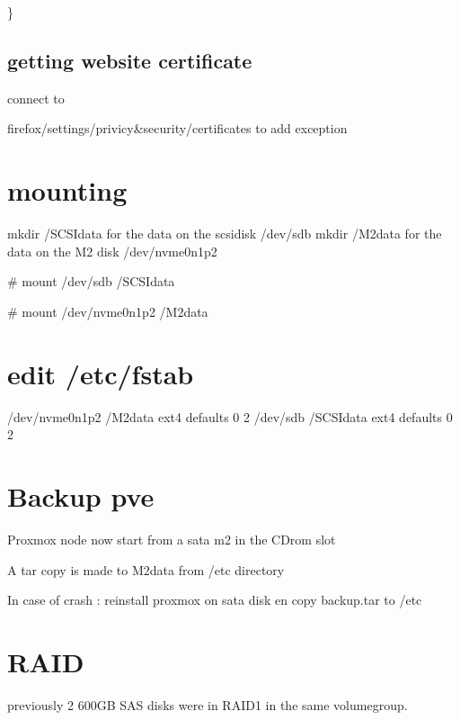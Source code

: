 \documentclass[letterpaper,10pt,english]{sphinxmanual}
\begin{document}
\sphinxAtStartPar
\}


\section{getting website certificate}
\label{\detokenize{elastic:getting-website-certificate}}
\sphinxAtStartPar
connect to 

\sphinxAtStartPar
firefox/settings/privicy\&security/certificates to add exception

\sphinxstepscope


\chapter{mounting}
\label{\detokenize{mounting:mounting}}\label{\detokenize{mounting::doc}}
\sphinxAtStartPar
mkdir /SCSIdata for the data on the scsidisk /dev/sdb
mkdir /M2data for the data on the M2 disk /dev/nvme0n1p2

\sphinxAtStartPar
\# mount /dev/sdb /SCSIdata

\sphinxAtStartPar
\# mount /dev/nvme0n1p2 /M2data


\chapter{edit  /etc/fstab}
\label{\detokenize{mounting:edit-etc-fstab}}
\sphinxAtStartPar
/dev/nvme0n1p2  /M2data  ext4  defaults  0  2
/dev/sdb  /SCSIdata  ext4  defaults  0  2

\sphinxstepscope


\chapter{Backup pve}
\label{\detokenize{backuppve:backup-pve}}\label{\detokenize{backuppve::doc}}
\sphinxAtStartPar
Proxmox node now start from a sata m2 in the CDrom slot

\sphinxAtStartPar
A tar copy is made to M2data from /etc directory

\sphinxAtStartPar
In case of crash : reinstall proxmox on sata disk en copy backup.tar to /etc

\sphinxstepscope


\chapter{RAID}
\label{\detokenize{raid:raid}}\label{\detokenize{raid::doc}}
\sphinxAtStartPar
previously 2 600GB SAS disks were in RAID1 in the same volumegroup.
\end{document}
